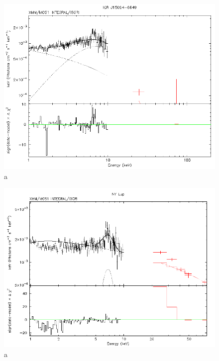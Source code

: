 \documentclass[oneside,a4paper,11pt]{report}
\begin{document}
\begin{figure}[!hbt]
\centering
\includegraphics[totalheight=8cm]{spec/1}
\caption{a}
\label{sp1} 
\end{figure}

\begin{figure}[!hbt]
\centering
\includegraphics[totalheight=8cm]{spec/2}
\caption{a}
\label{sp1} 
\end{figure}
\end{document}
